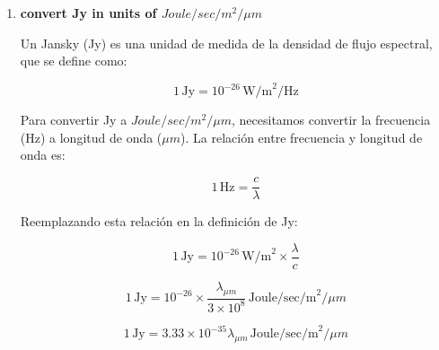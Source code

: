 \documentclass[11pt]{article}
\begin{document}
\begin{enumerate}
Donde:
\begin{itemize}
    \item $I$ es la irradiancia del Sol (1361 W/m²)
    \item $I_0$ es la irradiancia de referencia para la magnitud visual (aproximadamente $2.52 \times 10^{-8}$ W/m²)
\end{itemize}

Calculando la magnitud aparente del Sol:

\[
m_v = -2.5 \log_{10}\left(\frac{1361}{2.52 \times 10^{-8}}\right) \approx -26.74
\]

    \item \textbf{convert Jy in units of $Joule/sec/m^2/\mu m$}
    
Un Jansky (Jy) es una unidad de medida de la densidad de flujo espectral, que se define como:

\[
1 \, \text{Jy} = 10^{-26} \, \text{W/m}^2/\text{Hz}
\]

Para convertir Jy a $Joule/sec/m^2/\mu m$, necesitamos convertir la frecuencia (Hz) a longitud de onda ($\mu m$). La relación entre frecuencia y longitud de onda es:

\[
1 \, \text{Hz} = \frac{c}{\lambda}
\]

Reemplazando esta relación en la definición de Jy:

\[
1 \, \text{Jy} = 10^{-26} \, \text{W/m}^2 \times \frac{\lambda}{c}
\]

\[
1 \, \text{Jy} = 10^{-26} \times \frac{\lambda_{\mu m}}{3 \times 10^8} \, \text{Joule/sec/m}^2/\mu m
\]

\[1 \, \text{Jy} = 3.33 \times 10^{-35} \lambda_{\mu m} \, \text{Joule/sec/m}^2/\mu m
\]

\end{enumerate}
\end{document}
